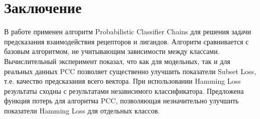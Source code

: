 \documentclass[12pt,twoside]{article}
\begin{document}
\section{Заключение}

В работе применен алгоритм Probabilistic Classifier Chains для решения задачи предсказания взаимодействия рецепторов и лигандов. Алгоритм сравнивается с базовым алгоритмом, не учитывающим зависимости между классами. Вычислительный эксперимент показал, что как для модельных, так и для реальных данных PCC позволяет существенно улучшить показатели Subset Loss, т.е. качество предсказания всего вектора. При использовании Hamming Loss результаты сходны с результатами независимого классификатора. Предложена функция потерь для алгоритма PCC, позволяющая незначительно улучшить показатели Hamming Loss для отдельных классов.


\clearpage

\end{document}
